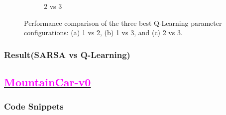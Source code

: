 \documentclass[11pt, a4]{article}
\begin{document}
\begin{figure}[H]
\begin{subfigure}{.7\textwidth}
							\caption{$2$ vs $3$}
							\label{fig:qlearningcartpole2vs3}
						\end{subfigure}
						\caption{Performance comparison of the three best Q-Learning parameter configurations: (a) 1 vs 2, (b) 1 vs 3, and (c) 2 vs 3.}
						\label{fig:qlearningcartpole}
					\end{figure}
				
			\subsubsection{Result(SARSA vs Q-Learning)}
		\subsection{\href{https://github.com/RitabrataMandal/RL-DA6400-assignment_1/tree/main/mountain_car-v0}{\textcolor{magenta}{MountainCar-v0}}}
			\subsubsection{Code Snippets}
				
				
				
				
				
\end{document}
